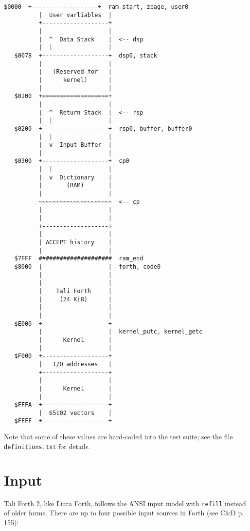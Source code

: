 \begin{lstlisting}[frame=single]
   $0000  +-------------------+  ram_start, zpage, user0
          |  User varliables  |
          +-------------------+  
          |                   |
          |  ^  Data Stack    |  <-- dsp
          |  |                |
   $0078  +-------------------+  dsp0, stack
          |                   |
          |   (Reserved for   |
          |      kernel)      |
          |                   |
   $0100  +===================+  
          |                   |
          |  ^  Return Stack  |  <-- rsp 
          |  |                |
   $0200  +-------------------+  rsp0, buffer, buffer0
          |  |                |
          |  v  Input Buffer  |
          |                   |
   $0300  +-------------------+  cp0
          |  |                |
          |  v  Dictionary    |
          |       (RAM)       |
          |                   |
          ~~~~~~~~~~~~~~~~~~~~~  <-- cp
          |                   |
          |                   |
          +-------------------+     
          |                   |
          | ACCEPT history    | 
          |                   |
   $7FFF  #####################  ram_end
   $8000  |                   |  forth, code0
          |                   |
          |                   |
          |    Tali Forth     |
          |     (24 KiB)      |
          |                   |
          |                   |
   $E000  +-------------------+
          |                   |  kernel_putc, kernel_getc   
          |      Kernel       |
          |                   |
   $F000  +-------------------+  
          |   I/O addresses   |
          +-------------------+     
          |                   |
          |      Kernel       |
          |                   |
   $FFFA  +-------------------+     
          |  65c02 vectors    |
   $FFFF  +-------------------+     
\end{lstlisting}

Note that some of these values are hard-coded into the test
suite; see the file \texttt{definitions.txt} for details.

\pagebreak

\section{Input}

Tali Forth 2, like Liara Forth, follows the ANSI input model
with \texttt{refill} instead of older forms. There are up to four possible input
sources in Forth (see C\&D p. 155):

